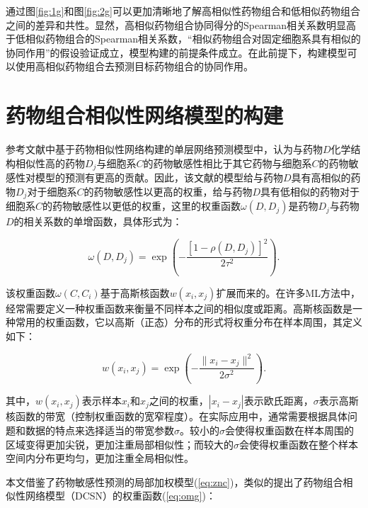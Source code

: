\vspace{-1em}

通过图\ref{fig:1g}和图\ref{fig:2g}可以更加清晰地了解高相似性药物组合和低相似药物组合之间的差异和共性。显然，高相似药物组合协同得分的Spearman相关系数明显高于低相似药物组合的Spearman相关系数，“相似药物组合对固定细胞系具有相似的协同作用”的假设验证成立，模型构建的前提条件成立。在此前提下，构建模型可以使用高相似药物组合去预测目标药物组合的协同作用。

\section{药物组合相似性网络模型的构建}

参考文献\cite{15}中基于药物相似性网络构建的单层网络预测模型中，认为与药物$D$化学结构相似性高的药物$D_j$与细胞系$C$的药物敏感性相比于其它药物与细胞系$C$的药物敏感性对模型的预测有更高的贡献。因此，该文献的模型给与药物$D$具有高相似的药物$D_j$对于细胞系$C$的药物敏感性以更高的权重，给与药物$D$具有低相似的药物对于细胞系$C$的药物敏感性以更低的权重，这里的权重函数$\omega(D,D_j)$是药物$D_j$与药物$D$的相关系数的单增函数，具体形式为：

\begin{equation}
\omega(D,D_j)=\exp\left(-\frac{[1-\rho(D,D_j)]^2}{2\tau^2}\right).\label{eq:znc}
\end{equation}

该权重函数$\omega(C,C_i)$基于高斯核函数$w(x_i, x_j)$扩展而来的。在许多ML方法中，经常需要定义一种权重函数来衡量不同样本之间的相似度或距离。高斯核函数是一种常用的权重函数，它以高斯（正态）分布的形式将权重分布在样本周围，其定义如下：

\vspace{-1em}

\begin{equation*}
w(x_i, x_j) = \exp\left(-\frac{{\|x_i - x_j\|^2}}{{2\sigma^2}}\right).
\end{equation*}

\noindent 其中，$w(x_i, x_j)$表示样本$x_i$和$x_j$之间的权重，$|x_i - x_j|$表示欧氏距离，$\sigma$表示高斯核函数的带宽（控制权重函数的宽窄程度）。在实际应用中，通常需要根据具体问题和数据的特点来选择适当的带宽参数$\sigma$。较小的$\sigma$会使得权重函数在样本周围的区域变得更加尖锐，更加注重局部相似性；而较大的$\sigma$会使得权重函数在整个样本空间内分布更均匀，更加注重全局相似性。

本文借鉴了药物敏感性预测的局部加权模型(\ref{eq:znc})，类似的提出了药物组合相似性网络模型（DCSN）的权重函数(\ref{eq:omg})：

